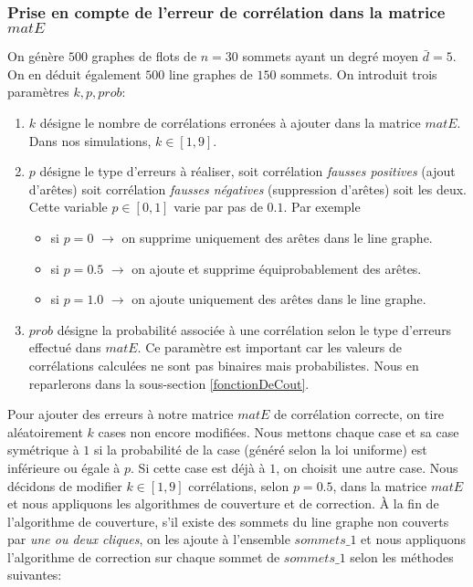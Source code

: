 \subsubsection{Prise en compte de l'erreur de corr\'elation dans la matrice $matE$}
On g\'en\`ere $500$ graphes de flots de $n = 30$ sommets ayant un degr\'e moyen $\bar d = 5$.
On en d\'eduit \'egalement $500$ line graphes de $150$ sommets.
On introduit trois param\`etres $k, p, prob$:
\begin{enumerate}
\item $k$ d\'esigne le nombre de corr\'elations erron\'ees \`a ajouter dans la matrice $matE$. Dans nos simulations, $k \in [1,9]$.
\item $p$ d\'esigne le type d'erreurs \`a r\'ealiser, soit corr\'elation {\em fausses positives} (ajout d'ar\^etes) soit corr\'elation {\em fausses n\'egatives} (suppression d'ar\^etes) soit les deux. Cette variable $p \in [0,1]$ varie par pas de $0.1$. Par exemple
	\begin{itemize}
	\item si $p=0$ $\rightarrow$ on supprime uniquement des ar\^etes dans le line graphe.
	\item si $p=0.5$ $\rightarrow$ on ajoute et supprime \'equiprobablement des ar\^etes.
	\item si $p=1.0$ $\rightarrow$ on ajoute uniquement des ar\^etes dans le line graphe.
	\end{itemize}
\item $prob$ d\'esigne la probabilit\'e associ\'ee \`a une corr\'elation selon le type d'erreurs effectu\'e dans $matE$. Ce param\`etre est important car les valeurs de corr\'elations calcul\'ees  ne sont pas binaires mais probabilistes. Nous en reparlerons dans la sous-section \ref{fonctionDeCout}.
\end{enumerate}
Pour ajouter des erreurs \`a notre matrice $matE$ de corr\'elation correcte, on tire al\'eatoirement $k$ cases non encore modifi\'ees. Nous mettons chaque case et sa case sym\'etrique \`a $1$ si la probabilit\'e de la case (g\'en\'er\'e selon la loi uniforme) est inf\'erieure ou \'egale \`a $p$. Si cette case est d\'ej\`a \`a $1$, on choisit une autre case.
\newline
Nous d\'ecidons de modifier $k \in [1, 9]$ corr\'elations, selon $p=0.5$, dans la matrice $matE$ et nous appliquons les algorithmes de couverture et de correction.
\`A la fin de l'algorithme de couverture, s'il existe des sommets du line graphe non couverts par {\em une ou deux cliques}, on les ajoute \`a l'ensemble $sommets\_1$ et nous appliquons l'algorithme  de correction sur chaque sommet de $sommets\_1$ selon les m\'ethodes suivantes:
